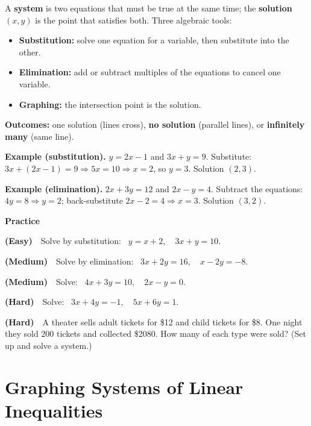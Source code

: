 \documentclass[11pt]{article}
\newcommand{\easy}{{\small\color{FangGreen}\textbf{(Easy)}}}
\newcommand{\med}{{\small\color{FangOrange}\textbf{(Medium)}}}
\newcommand{\hard}{{\small\color{FangAccent}\textbf{(Hard)}}}
\begin{document}
\begin{summary}
A \textbf{system} is two equations that must be true at the same time; the \textbf{solution} $(x,y)$ is the point
that satisfies both. Three algebraic tools:
\begin{itemize}[leftmargin=1.4em,itemsep=1pt,topsep=2pt]
  \item \textbf{Substitution:} solve one equation for a variable, then substitute into the other.
  \item \textbf{Elimination:} add or subtract multiples of the equations to cancel one variable.
  \item \textbf{Graphing:} the intersection point is the solution.
\end{itemize}
\textbf{Outcomes:} one solution (lines cross), \textbf{no solution} (parallel lines), or
\textbf{infinitely many} (same line).
\end{summary}

\begin{example}
\textbf{Example (substitution).} $y = 2x-1$ and $3x + y = 9$. Substitute:
$3x + (2x-1) = 9 \Rightarrow 5x = 10 \Rightarrow x = 2$, so $y = 3$. Solution $(2,3)$.

\smallskip
\textbf{Example (elimination).} $2x+3y=12$ and $2x-y=4$. Subtract the equations:
$4y = 8 \Rightarrow y = 2$; back-substitute $2x - 2 = 4 \Rightarrow x = 3$. Solution $(3,2)$.
\end{example}

\textbf{Practice}
\begin{practice}
  \item \easy\ \ Solve by substitution: \ $y = x+2,\quad 3x + y = 10.$
  \item \med\ \ Solve by elimination: \ $3x + 2y = 16,\quad x - 2y = -8.$
  \item \med\ \ Solve: \ $4x + 3y = 10,\quad 2x - y = 0.$
  \item \hard\ \ Solve: \ $3x + 4y = -1,\quad 5x + 6y = 1.$
  \item \hard\ \ A theater sells adult tickets for \$12 and child tickets for \$8. One night they sold $200$
        tickets and collected \$2080. How many of each type were sold? (Set up and solve a system.)
\end{practice}

\section{Graphing Systems of Linear Inequalities}
\end{document}

